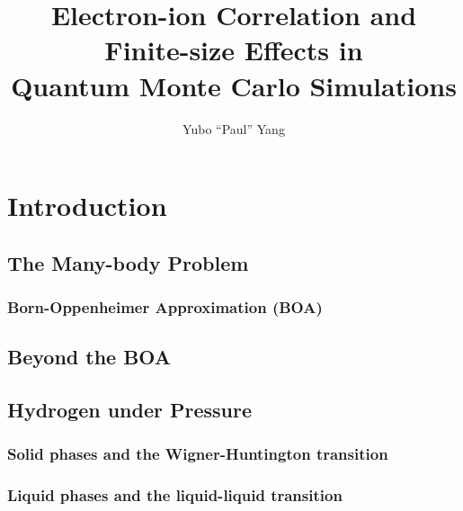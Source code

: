 \documentclass[draftthesis,fullpage]{uiucthesis}
\begin{document}
\title{Electron-ion Correlation and Finite-size Effects in\\
       Quantum Monte Carlo Simulations}
\author{Yubo ``Paul'' Yang}
\phdthesis
{}

%
\tableofcontents
%
\mainmatter

\chapter{Introduction}
\section{The Many-body Problem}
\subsection{Born-Oppenheimer Approximation (BOA)}
\section{Beyond the BOA}
\section{Hydrogen under Pressure}
\subsection{Solid phases and the Wigner-Huntington transition}
\subsection{Liquid phases and the liquid-liquid transition}
\end{document}
